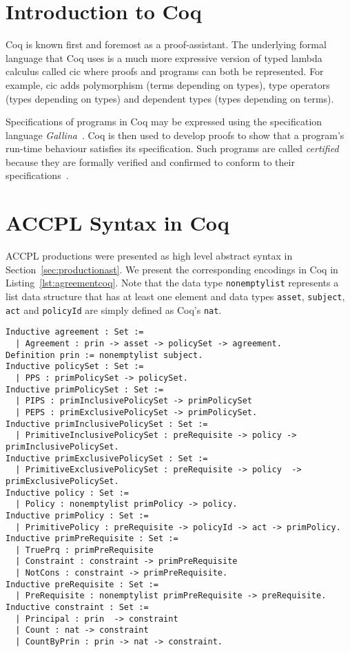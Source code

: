 \documentclass[runningheads,a4paper]{llncs}
\newcommand{\syn}{\texttt}
\begin{document}
\section{Introduction to Coq}

Coq is known first and foremost as a proof-assistant. The underlying formal language that Coq uses is a much more expressive version of typed lambda calculus called \ac{cic} where proofs and programs can both be represented. For example, \ac{cic} adds polymorphism (terms depending on types), type operators (types depending on types) and dependent types (types depending on terms).

Specifications of programs in Coq may be expressed using the specification language \emph{Gallina}~\cite{gallinaref}. Coq is then used to develop proofs to show that a program's run-time behaviour satisfies its specification. Such programs are called \emph{certified} because they are formally verified and confirmed to conform to their specifications~\cite{BC04}.

\section{ACCPL Syntax in Coq}\label{sec:agreementConstructor}

\ac{ACCPL} productions were presented as high level abstract syntax in Section~\ref{sec:productionast}. We present the corresponding encodings in Coq in Listing~\ref{lst:agreementcoq}. Note that the data type \syn{nonemptylist} represents a list data structure that has at least one element and data types \syn{asset}, \syn{subject}, \syn{act} and \syn{policyId} are simply defined as Coq's \syn{nat}.

\lstset{language=Coq}
\begin{minipage}[c]{0.95\textwidth}
\begin{lstlisting}[frame=single, caption={ACCPL: Coq Version of Agreement},label={lst:agreementcoq}]
Inductive agreement : Set :=
  | Agreement : prin -> asset -> policySet -> agreement.
Definition prin := nonemptylist subject.
Inductive policySet : Set :=
  | PPS : primPolicySet -> policySet.
Inductive primPolicySet : Set :=
  | PIPS : primInclusivePolicySet -> primPolicySet
  | PEPS : primExclusivePolicySet -> primPolicySet.
Inductive primInclusivePolicySet : Set :=
  | PrimitiveInclusivePolicySet : preRequisite -> policy -> primInclusivePolicySet.
Inductive primExclusivePolicySet : Set :=
  | PrimitiveExclusivePolicySet : preRequisite -> policy  -> primExclusivePolicySet.
Inductive policy : Set :=
  | Policy : nonemptylist primPolicy -> policy.
Inductive primPolicy : Set :=
  | PrimitivePolicy : preRequisite -> policyId -> act -> primPolicy.  
Inductive primPreRequisite : Set :=
  | TruePrq : primPreRequisite
  | Constraint : constraint -> primPreRequisite
  | NotCons : constraint -> primPreRequisite.
Inductive preRequisite : Set :=
  | PreRequisite : nonemptylist primPreRequisite -> preRequisite.
Inductive constraint : Set :=
  | Principal : prin  -> constraint 
  | Count : nat -> constraint 
  | CountByPrin : prin -> nat -> constraint.  
\end{lstlisting}
\end{minipage}
\end{document}
